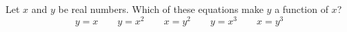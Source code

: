 Let $x$ and $y$ be real numbers.
Which of these equations make $y$ a function of $x$?
\begin{equation*}
  y=x \qquad y=x^2 \qquad x=y^2 \qquad y=x^3 \qquad x=y^3
\end{equation*}
